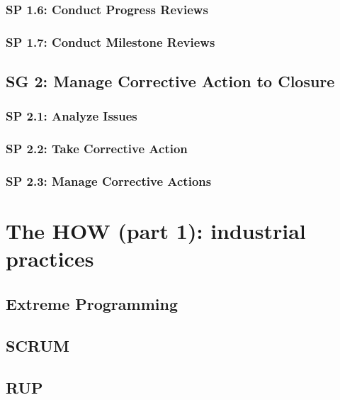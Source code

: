 \documentclass[accentcolor=tud10d]{tudbeamer}
\begin{document}
\subsubsection{SP 1.6: Conduct Progress Reviews}

\subsubsection{SP 1.7: Conduct Milestone Reviews}

\subsection{SG 2: Manage Corrective Action to Closure}

\subsubsection{SP 2.1: Analyze Issues}

\subsubsection{SP 2.2: Take Corrective Action}

\subsubsection{SP 2.3: Manage Corrective Actions}

\section{The HOW (part 1): industrial practices}
\begin{frame}
	
\cite{alegria2006cmmiagile}

\end{frame}

\subsection{Extreme Programming}


\subsection{SCRUM}

\subsection{RUP}
\end{document}
